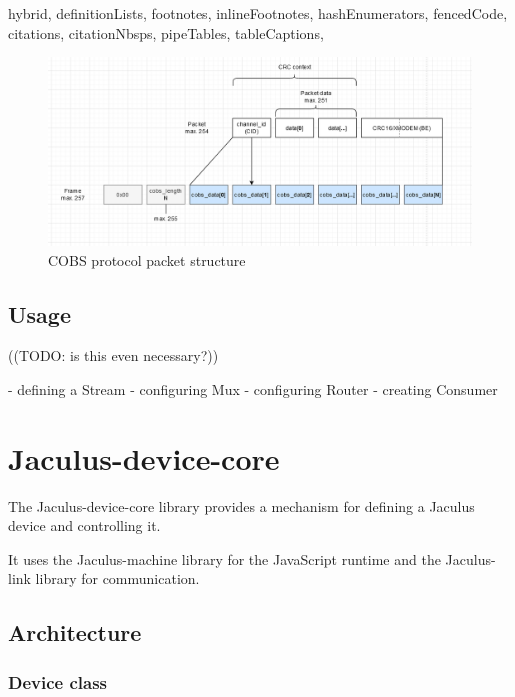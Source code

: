 \documentclass[
  digital,
  oneside,
  nosansbold,
  nocolorbold,
  lof,
  lot
]{fithesis4}
\begin{document}
\begin{markdown*}{%
  hybrid,
  definitionLists,
  footnotes,
  inlineFootnotes,
  hashEnumerators,
  fencedCode,
  citations,
  citationNbsps,
  pipeTables,
  tableCaptions,
}
\begin{figure}[ht]
    \centering
    \includegraphics[width=\textwidth]{cobs-diagram}
    \caption{COBS protocol packet structure}
    \label{fig:cobs-diagram}
\end{figure}


\section{Usage}

((TODO: is this even necessary?))

  - defining a Stream
  - configuring Mux
  - configuring Router
  - creating Consumer


\chapter{Jaculus-device-core}

The Jaculus-device-core library provides a mechanism for defining a Jaculus device and controlling it.

It uses the Jaculus-machine library for the JavaScript runtime and the Jaculus-link library for communication.



\section{Architecture}

\subsection{Device class}


\end{markdown*}
\end{document}
